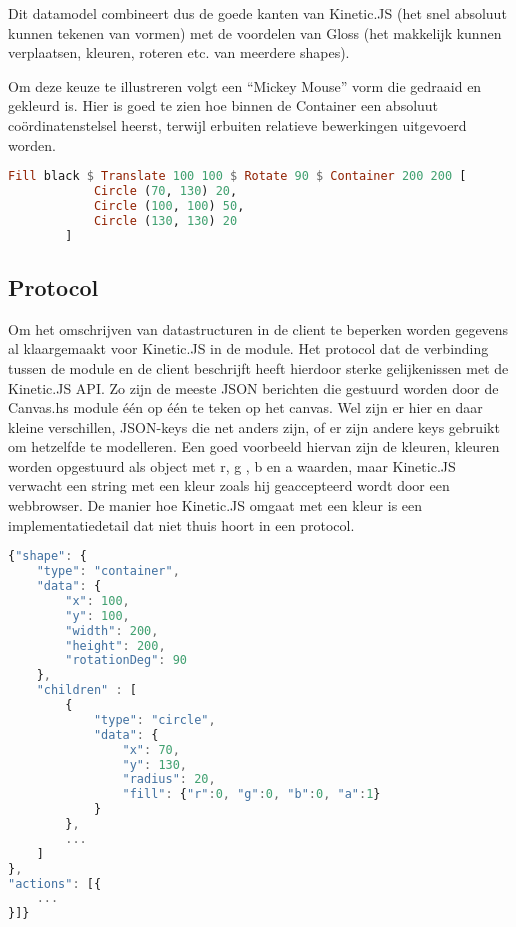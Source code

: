 Dit datamodel combineert dus de goede kanten van Kinetic.JS (het snel absoluut kunnen tekenen van vormen) met de voordelen van Gloss (het makkelijk kunnen verplaatsen, kleuren, roteren etc. van meerdere shapes).

Om deze keuze te illustreren volgt een ``Mickey Mouse'' vorm die gedraaid en gekleurd is. Hier is goed te zien hoe binnen de Container een absoluut co\"ordinatenstelsel heerst, terwijl erbuiten relatieve bewerkingen uitgevoerd worden.

\begin{lstlisting}[style=densecode, language=Haskell]
Fill black $ Translate 100 100 $ Rotate 90 $ Container 200 200 [
            Circle (70, 130) 20,
            Circle (100, 100) 50,
            Circle (130, 130) 20
        ]
\end{lstlisting}

\subsection{Protocol}
Om het omschrijven van datastructuren in de client te beperken worden gegevens al klaargemaakt voor Kinetic.JS in de module. Het protocol dat de verbinding tussen de module en de client beschrijft heeft hierdoor sterke gelijkenissen met de Kinetic.JS API. Zo zijn de meeste JSON berichten die gestuurd worden door de Canvas.hs module één op één te teken op het canvas. Wel zijn er hier en daar kleine verschillen, JSON-keys die net anders zijn, of er zijn andere keys gebruikt om hetzelfde te modelleren. Een goed voorbeeld hiervan zijn de kleuren, kleuren worden opgestuurd als object met r, g , b en a waarden, maar Kinetic.JS verwacht een string met een kleur zoals hij geaccepteerd wordt door een webbrowser. De manier hoe Kinetic.JS omgaat met een kleur is een implementatiedetail dat niet thuis hoort in een protocol.

\begin{lstlisting}[style=densecode, language=JavaScript]
{"shape": {
    "type": "container",
    "data": {
        "x": 100,
        "y": 100,
        "width": 200,
        "height": 200,
        "rotationDeg": 90
    },
    "children" : [
        {
            "type": "circle",
            "data": {
                "x": 70,
                "y": 130,
                "radius": 20,
                "fill": {"r":0, "g":0, "b":0, "a":1}
            }
        },
        ...
    ]
},
"actions": [{
    ...
}]}
\end{lstlisting}

